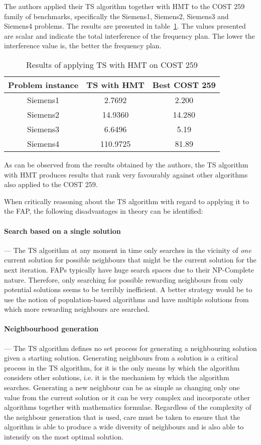 The authors applied their TS algorithm together with HMT to the COST 259 family of benchmarks, specifically the Siemens1, Siemens2, Siemens3 and Siemens4 problems. The results are presented in table~\ref{TSCOST259}. The values presented are scalar and indicate the total interference of the frequency plan. The lower the interference value is, the better the frequency plan.
\begin{table}[H]
\centering
	\begin{tabular}{| c | c | c |}
		\hline
		Problem instance & TS with HMT & Best COST 259 \\ \hline
		Siemens1 & 2.7692 & 2.200 \\ \hline
		Siemens2 & 14.9360 & 14.280 \\ \hline
		Siemens3 & 6.6496 & 5.19 \\ \hline
		Siemens4 & 110.9725 & 81.89 \\ \hline
	\end{tabular}
\caption{Results of applying TS with HMT on COST 259}
\label{TSCOST259}
\end{table}
As can be observed from the results obtained by the authors, the TS algorithm with HMT produces results that rank very favourably against other algorithms also applied to the COST 259.

When critically reasoning about the TS algorithm with regard to applying it to the FAP, the following disadvantages in theory can be identified:
\paragraph{Search based on a single solution}
--- The TS algorithm at any moment in time only searches in the vicinity of \emph{one} current solution for possible neighbours that might be the current solution for the next iteration. FAPs typically have huge search spaces due to their NP-Complete nature. Therefore, only searching for possible rewarding neighbours from only potential solutions seems to be terribly inefficient. A better strategy would be to use the notion of population-based algorithms and have multiple solutions from which more rewarding neighbours are searched.
\paragraph{Neighbourhood generation}
--- The TS algorithm defines no set process for generating a neighbouring solution given a starting solution. Generating neighbours from a solution is a critical process in the TS algorithm, for it is the only means by which the algorithm considers other solutions, i.e. it is the mechanism by which the algorithm searches. Generating a new neighbour can be as simple as changing only one value from the current solution or it can be very complex and incorporate other algorithms together with mathematics formulae. Regardless of the complexity of the neighbour generation that is used, care must be taken to ensure that the algorithm is able to produce a wide diversity of neighbours and is also able to intensify on the most optimal solution.
